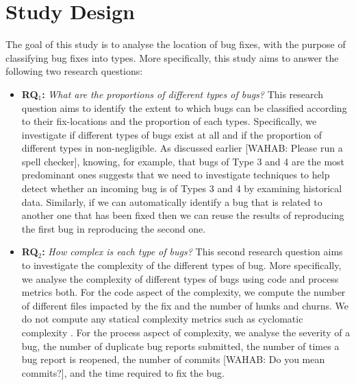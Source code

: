 
\section{Study Design}

The goal of this study is to analyse the location of bug fixes, with the purpose of classifying bug fixes into types.
More specifically, this study aims to answer the following two research questions:

\begin{itemize}
	\item {\bf RQ$_1$:} {\it What are the proportions of different types of bugs?} This research question aims to identify the extent to which bugs can be classified according to their fix-locations and the proportion of each types.
  Specifically, we investigate if different types of bugs exist at all and if the proportion of different types in non-negligible.
  As discussed earlier [WAHAB: Please run a spell checker], knowing, for example, that bugs of Type 3 and 4 are the most predominant ones suggests that we need to investigate techniques to help detect whether an incoming bug is of Types 3 and 4 by examining historical data.
  Similarly, if we can automatically identify a bug that is related to another one that has been fixed then we can reuse the results of reproducing the first bug in reproducing the second one.

	\item {\bf RQ$_2$:} {\it How complex is each type of bugs?} This second research question aims to investigate the complexity of the different types of bug.
  More specifically, we analyse  the complexity of different types of bugs using code and process metrics both.
  For the code aspect of the complexity, we compute the number of different files impacted by the fix and the number of hunks and churns.
  We do not compute any statical complexity metrics such as cyclomatic complexity \cite{McCabe1989}.
  For the process aspect of complexity, we analyse the severity of a bug, the number of duplicate bug reports submitted, the number of times a bug report is reopened, the number of commits [WAHAB: Do you mean commits?], and the time required to fix the bug.


\end{itemize}





